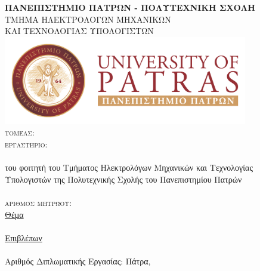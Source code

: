 \begin{titlepage}
\begin{center}
\textsc{\textbf{\large ΠΑΝΕΠΙΣΤΗΜΙΟ ΠΑΤΡΩΝ - ΠΟΛΥΤΕΧΝΙΚΗ ΣΧΟΛΗ}\\
\large ΤΜΗΜΑ ΗΛΕΚΤΡΟΛΟΓΩΝ ΜΗΧΑΝΙΚΩΝ\\ΚΑΙ ΤΕΧΝΟΛΟΓΙΑΣ ΥΠΟΛΟΓΙΣΤΩΝ}\\

\includegraphics[width= 0.8\textwidth]{images/up_2017_logo_en.png}\\  

\textsc{\Large τομέας: \division \\
εργαστήριο: \lab }\\[1cm]

\textsc{\uline{\LARGE{\shortdoctitle }}}\\ [0.5cm]
του φοιτητή του Τμήματος Ηλεκτρολόγων Μηχανικών και Τεχνολογίας\\
Υπολογιστών της Πολυτεχνικής Σχολής  του Πανεπιστημίου Πατρών\\[1cm]

\textsc{\LARGE \me }\\[0.5cm]
\textsc{\Large αριθμός μητρώου: \studnum}\\[1cm]

\uline{\large Θέμα}\\[0.5cm]
\textbf{\large \doctitle }\\[1cm]
\uline{\large Επιβλέπων}\\[0.5cm]
\large \suptitle \, \supname \\[1cm]
\large{Αριθμός Διπλωματικής Εργασίας: }\hspace{3cm}
\vfill
\large{Πάτρα, \monthyear}
\end{center}
\end{titlepage}